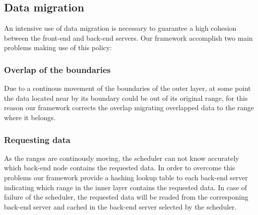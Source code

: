 
%

\subsection{Data migration}
An intensive use of data migration is necessary to guarantee a high cohesion between the 
front-end and back-end servers. Our framework accomplish two main problems making use of this policy:

\subsubsection{Overlap of the boundaries}
Due to a continous movement of the boundaries of the outer layer, at some point the data located near by
its boundary could be out of its original range, for this reason our framework corrects the overlap migrating
overlapped data to the range where it belongs.

\subsubsection{Requesting data}
As the ranges are continously moving, the scheduler can not know accurately which back-end node contains
the requested data. In order to overcome this problems our framework provide a hashing lookup table
to each back-end server indicating which range in the inner layer contains the requested data. 
In case of failure of the scheduler, the requested data will be readed from the corresponing back-end server
and cached in the back-end server selected by the scheduler.

